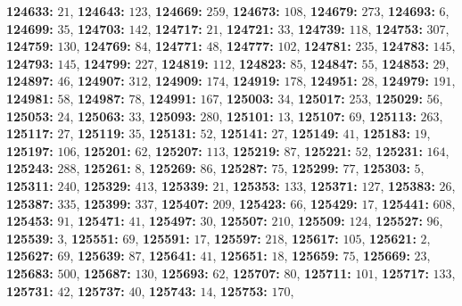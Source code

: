 \textsf{\bfseries 124633:} $21$, \textsf{\bfseries 124643:} $123$, \textsf{\bfseries 124669:} $259$, \textsf{\bfseries 124673:} $108$, \textsf{\bfseries 124679:} $273$, \textsf{\bfseries 124693:} $6$, \textsf{\bfseries 124699:} $35$, \textsf{\bfseries 124703:} $142$, \textsf{\bfseries 124717:} $21$, \textsf{\bfseries 124721:} $33$, \textsf{\bfseries 124739:} $118$, \textsf{\bfseries 124753:} $307$, \textsf{\bfseries 124759:} $130$, \textsf{\bfseries 124769:} $84$, \textsf{\bfseries 124771:} $48$, \textsf{\bfseries 124777:} $102$, \textsf{\bfseries 124781:} $235$, \textsf{\bfseries 124783:} $145$, \textsf{\bfseries 124793:} $145$, \textsf{\bfseries 124799:} $227$, \textsf{\bfseries 124819:} $112$, \textsf{\bfseries 124823:} $85$, \textsf{\bfseries 124847:} $55$, \textsf{\bfseries 124853:} $29$, \textsf{\bfseries 124897:} $46$, \textsf{\bfseries 124907:} $312$, \textsf{\bfseries 124909:} $174$, \textsf{\bfseries 124919:} $178$, \textsf{\bfseries 124951:} $28$, \textsf{\bfseries 124979:} $191$, \textsf{\bfseries 124981:} $58$, \textsf{\bfseries 124987:} $78$, \textsf{\bfseries 124991:} $167$, \textsf{\bfseries 125003:} $34$, \textsf{\bfseries 125017:} $253$, \textsf{\bfseries 125029:} $56$, \textsf{\bfseries 125053:} $24$, \textsf{\bfseries 125063:} $33$, \textsf{\bfseries 125093:} $280$, \textsf{\bfseries 125101:} $13$, \textsf{\bfseries 125107:} $69$, \textsf{\bfseries 125113:} $263$, \textsf{\bfseries 125117:} $27$, \textsf{\bfseries 125119:} $35$, \textsf{\bfseries 125131:} $52$, \textsf{\bfseries 125141:} $27$, \textsf{\bfseries 125149:} $41$, \textsf{\bfseries 125183:} $19$, \textsf{\bfseries 125197:} $106$, \textsf{\bfseries 125201:} $62$, \textsf{\bfseries 125207:} $113$, \textsf{\bfseries 125219:} $87$, \textsf{\bfseries 125221:} $52$, \textsf{\bfseries 125231:} $164$, \textsf{\bfseries 125243:} $288$, \textsf{\bfseries 125261:} $8$, \textsf{\bfseries 125269:} $86$, \textsf{\bfseries 125287:} $75$, \textsf{\bfseries 125299:} $77$, \textsf{\bfseries 125303:} $5$, \textsf{\bfseries 125311:} $240$, \textsf{\bfseries 125329:} $413$, \textsf{\bfseries 125339:} $21$, \textsf{\bfseries 125353:} $133$, \textsf{\bfseries 125371:} $127$, \textsf{\bfseries 125383:} $26$, \textsf{\bfseries 125387:} $335$, \textsf{\bfseries 125399:} $337$, \textsf{\bfseries 125407:} $209$, \textsf{\bfseries 125423:} $66$, \textsf{\bfseries 125429:} $17$, \textsf{\bfseries 125441:} $608$, \textsf{\bfseries 125453:} $91$, \textsf{\bfseries 125471:} $41$, \textsf{\bfseries 125497:} $30$, \textsf{\bfseries 125507:} $210$, \textsf{\bfseries 125509:} $124$, \textsf{\bfseries 125527:} $96$, \textsf{\bfseries 125539:} $3$, \textsf{\bfseries 125551:} $69$, \textsf{\bfseries 125591:} $17$, \textsf{\bfseries 125597:} $218$, \textsf{\bfseries 125617:} $105$, \textsf{\bfseries 125621:} $2$, \textsf{\bfseries 125627:} $69$, \textsf{\bfseries 125639:} $87$, \textsf{\bfseries 125641:} $41$, \textsf{\bfseries 125651:} $18$, \textsf{\bfseries 125659:} $75$, \textsf{\bfseries 125669:} $23$, \textsf{\bfseries 125683:} $500$, \textsf{\bfseries 125687:} $130$, \textsf{\bfseries 125693:} $62$, \textsf{\bfseries 125707:} $80$, \textsf{\bfseries 125711:} $101$, \textsf{\bfseries 125717:} $133$, \textsf{\bfseries 125731:} $42$, \textsf{\bfseries 125737:} $40$, \textsf{\bfseries 125743:} $14$, \textsf{\bfseries 125753:} $170$, 
